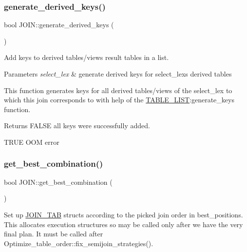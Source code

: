 \subsubsection{\texorpdfstring{generate\+\_\+derived\+\_\+keys()}{generate\_derived\_keys()}}
{\footnotesize\ttfamily bool J\+O\+I\+N\+::generate\+\_\+derived\+\_\+keys (\begin{DoxyParamCaption}{ }\end{DoxyParamCaption})}



Add keys to derived tables\textquotesingle{}/views\textquotesingle{} result tables in a list. 


\begin{DoxyParams}{Parameters}
{\em select\+\_\+lex} & generate derived keys for select\+\_\+lex\textquotesingle{}s derived tables\\
\hline
\end{DoxyParams}
This function generates keys for all derived tables/views of the select\+\_\+lex to which this join corresponds to with help of the \mbox{\hyperlink{structTABLE__LIST}{T\+A\+B\+L\+E\+\_\+\+L\+I\+ST}}\+:generate\+\_\+keys function.

\begin{DoxyReturn}{Returns}
F\+A\+L\+SE all keys were successfully added. 

T\+R\+UE O\+OM error 
\end{DoxyReturn}
\mbox{\label{group__Query__Optimizer_gae9c1cf0874f4bda777557d012148e059}} 
\subsubsection{\texorpdfstring{get\+\_\+best\+\_\+combination()}{get\_best\_combination()}}
{\footnotesize\ttfamily bool J\+O\+I\+N\+::get\+\_\+best\+\_\+combination (\begin{DoxyParamCaption}{ }\end{DoxyParamCaption})}

Set up \mbox{\hyperlink{classJOIN__TAB}{J\+O\+I\+N\+\_\+\+T\+AB}} structs according to the picked join order in best\+\_\+positions. This allocates execution structures so may be called only after we have the very final plan. It must be called after Optimize\+\_\+table\+\_\+order\+::fix\+\_\+semijoin\+\_\+strategies().

